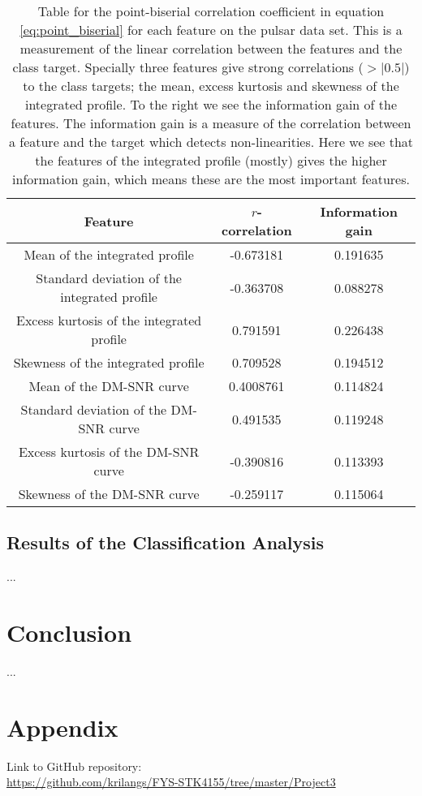 \documentclass[12pt,a4paper,english]{article}
\begin{document}
\begin{table}[htbp!]
	\centering
	\begin{tabular}{ |c|c|c| }
		\hline \rule{0pt}{13pt}
		Feature & $r$-correlation & Information gain \\
		\hline \rule{0pt}{13pt}
		Mean of the integrated profile & -0.673181 & 0.191635 \\
		\hline \rule{0pt}{13pt}
		Standard deviation of the integrated profile & -0.363708 & 0.088278 \\
		\hline \rule{0pt}{13pt}
		Excess kurtosis of the integrated profile & 0.791591 & 0.226438 \\
		\hline \rule{0pt}{13pt}
		Skewness of the integrated profile & 0.709528 & 0.194512 \\
		\hline \rule{0pt}{13pt}
		Mean of the DM-SNR curve & 0.4008761 & 0.114824 \\
		\hline \rule{0pt}{13pt}
		Standard deviation of the DM-SNR curve & 0.491535 & 0.119248 \\
		\hline \rule{0pt}{13pt}
		Excess kurtosis of the DM-SNR curve & -0.390816 & 0.113393 \\
		\hline \rule{0pt}{13pt}
		Skewness of the DM-SNR curve & -0.259117 &0.115064 \\
		\hline
	\end{tabular}	
	\caption{Table for the point-biserial correlation coefficient in equation \ref{eq:point_biserial} for each feature on the pulsar data set. This is a measurement of the linear correlation between the features and the class target. Specially three features give strong correlations ($>|0.5|$) to the class targets; the mean, excess kurtosis and skewness of the integrated profile. To the right we see the information gain of the features. The information gain is a measure of the correlation between a feature and the target which detects non-linearities. Here we see that the features of the integrated profile (mostly) gives the higher information gain, which means these are the most important features. \label{tab:correlations}}
\end{table}

\subsection{Results of the Classification Analysis}
\label{subsect:Res_class}
...
\section{Conclusion}
\label{sect:Conclusion}
...
\appendix
\section{Appendix}
\label{sect:Appendix}
Link to GitHub repository:\\
\url{https://github.com/krilangs/FYS-STK4155/tree/master/Project3}



\end{document}
